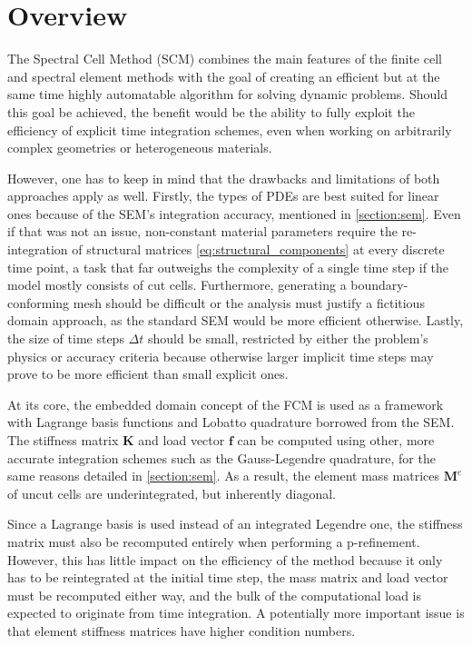 %
\section{Overview}
\label{section:overview}
%

The Spectral Cell Method (SCM) combines the main features of the finite cell and spectral element methods with the goal of creating an efficient but at the same time highly automatable algorithm for solving dynamic problems. Should this goal be achieved, the benefit would be the ability to fully exploit the efficiency of explicit time integration schemes, even when working on arbitrarily complex geometries or heterogeneous materials.

However, one has to keep in mind that the drawbacks and limitations of both approaches apply as well. Firstly, the types of PDEs are best suited for linear ones because of the SEM's integration accuracy, mentioned in \ref{section:sem}. Even if that was not an issue, non-constant material parameters require the re-integration of structural matrices \ref{eq:structural_components} at every discrete time point, a task that far outweighs the complexity of a single time step if the model mostly consists of cut cells. Furthermore, generating a boundary-conforming mesh should be difficult or the analysis must justify a fictitious domain approach, as the standard SEM would be more efficient otherwise. Lastly, the size of time steps $\Delta t$ should be small, restricted by either the problem's physics or accuracy criteria because otherwise larger implicit time steps may prove to be more efficient than small explicit ones.

At its core, the embedded domain concept of the FCM is used as a framework with Lagrange basis functions and Lobatto quadrature borrowed from the SEM. The stiffness matrix $\mathbf K$ and load vector $\mathbf f$ can be computed using other, more accurate integration schemes such as the Gauss-Legendre quadrature, for the same reasons detailed in \ref{section:sem}. As a result, the element mass matrices $\mathbf M^e$ of uncut cells are underintegrated, but inherently diagonal.

Since a Lagrange basis is used instead of an integrated Legendre one, the stiffness matrix must also be recomputed entirely when performing a p-refinement. However, this has little impact on the efficiency of the method because it only has to be reintegrated at the initial time step, the mass matrix and load vector must be recomputed either way, and the bulk of the computational load is expected to originate from time integration. A potentially more important issue is that element stiffness matrices have higher condition numbers.